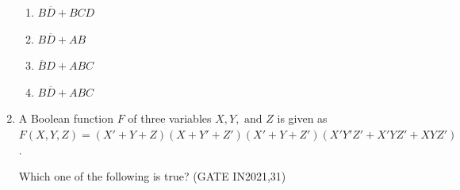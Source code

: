 \begin{enumerate}[label=\arabic*.,ref=\theenumi]
\begin{figure}[H]
\centering

	\caption{}
\label{fig:k-map-E}
\end{figure}

\begin{enumerate}[label=\Alph*.]
\item $B\overline{D} + BCD$
\item $B\overline{D} + AB$
\item $\overline{B}D + ABC$
\item $B\overline{D} + ABC$
\end{enumerate}

\item A Boolean function $F$ of three variables $X, Y, \text{ and } Z$ is given as 
$F(X, Y, Z) = (X' + Y + Z)(X + Y' + Z') (X' + Y + Z') (X'Y'Z' + X' Y Z' + XYZ')$.

Which one of the following is true?
\hfill(GATE IN2021,31)


\end{enumerate}
